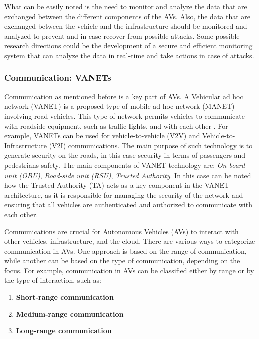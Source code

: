 What can be easily noted is the need to monitor and analyze the data that are exchanged between the different components of the AVs.
Also, the data that are exchanged between the vehicle and the infrastructure should be monitored and analyzed to prevent and in case recover from possible attacks.
Some possible research directions could be the development of a secure and efficient monitoring system that can analyze the data in real-time and take actions in case of attacks.

\subsubsection{Communication: VANETs}\label{subsubsec:communication}

Communication as mentioned before is a key part of AVs.
A Vehicular ad hoc network (VANET) is a proposed type of mobile ad hoc network (MANET) involving road vehicles.
This type of network permits vehicles to communicate with roadside equipment, such as traffic lights, and with each other \cite{sheikh2019comprehensive} .
For example, VANETs can be used for vehicle-to-vehicle (V2V) and Vehicle-to-Infrastructure (V2I) communications.
The main purpose of such technology is to generate security on the roads, in this case security in terms of passengers and pedestrians safety.
The main components of VANET technology are: \textit{On-board unit (OBU)}, \textit{Road-side unit (RSU)}, \textit{Trusted Authority}.
In this case can be noted how the Trusted Authority (TA) acts as a key component in the VANET architecture, as it is responsible for managing the security of the network and ensuring that all vehicles are authenticated and authorized to communicate with each other.

Communications are crucial for Autonomous Vehicles (AVs) to interact with other vehicles, infrastructure, and the cloud.
There are various ways to categorize communication in AVs. One approach is based on the range of communication, while another can be based on the type of communication, depending on the focus.
For example, communication in AVs can be classified either by range or by the type of interaction, such as:
\begin{enumerate}
    \item \textbf{Short-range communication}
    \item \textbf{Medium-range communication}
    \item \textbf{Long-range communication}
\end{enumerate}

